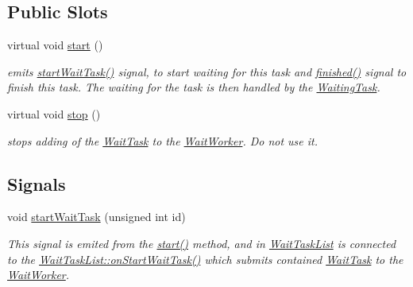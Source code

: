 \subsection*{Public Slots}
\begin{DoxyCompactItemize}
\item 
\hypertarget{class_wait_exp_task_a355f9031b6b4cbf0e3b17072fd92e57e}{}virtual void \hyperlink{class_wait_exp_task_a355f9031b6b4cbf0e3b17072fd92e57e}{start} ()\label{class_wait_exp_task_a355f9031b6b4cbf0e3b17072fd92e57e}

\begin{DoxyCompactList}\small\item\em emits \hyperlink{class_wait_exp_task_a0e6b8df7760857ace81f82deb888fb23}{start\+Wait\+Task()} signal, to start waiting for this task and \hyperlink{class_exp_task_aeb51d072a7b96f55da3738a8c7733611}{finished()} signal to finish this task. The waiting for the task is then handled by the \hyperlink{class_waiting_task}{Waiting\+Task}. \end{DoxyCompactList}\item 
\hypertarget{class_wait_exp_task_a7d34d773042648d601c67a5b2c9ee55d}{}virtual void \hyperlink{class_wait_exp_task_a7d34d773042648d601c67a5b2c9ee55d}{stop} ()\label{class_wait_exp_task_a7d34d773042648d601c67a5b2c9ee55d}

\begin{DoxyCompactList}\small\item\em stops adding of the \hyperlink{class_wait_task}{Wait\+Task} to the \hyperlink{class_wait_worker}{Wait\+Worker}. Do not use it. \end{DoxyCompactList}\end{DoxyCompactItemize}
\subsection*{Signals}
\begin{DoxyCompactItemize}
\item 
\hypertarget{class_wait_exp_task_a0e6b8df7760857ace81f82deb888fb23}{}void \hyperlink{class_wait_exp_task_a0e6b8df7760857ace81f82deb888fb23}{start\+Wait\+Task} (unsigned int id)\label{class_wait_exp_task_a0e6b8df7760857ace81f82deb888fb23}

\begin{DoxyCompactList}\small\item\em This signal is emited from the \hyperlink{class_wait_exp_task_a355f9031b6b4cbf0e3b17072fd92e57e}{start()} method, and in \hyperlink{class_wait_task_list}{Wait\+Task\+List} is connected to the \hyperlink{class_wait_task_list_a802528b32bbcacb201bdd5fcfc4dacf6}{Wait\+Task\+List\+::on\+Start\+Wait\+Task()} which submits contained \hyperlink{class_wait_task}{Wait\+Task} to the \hyperlink{class_wait_worker}{Wait\+Worker}. \end{DoxyCompactList}\end{DoxyCompactItemize}

